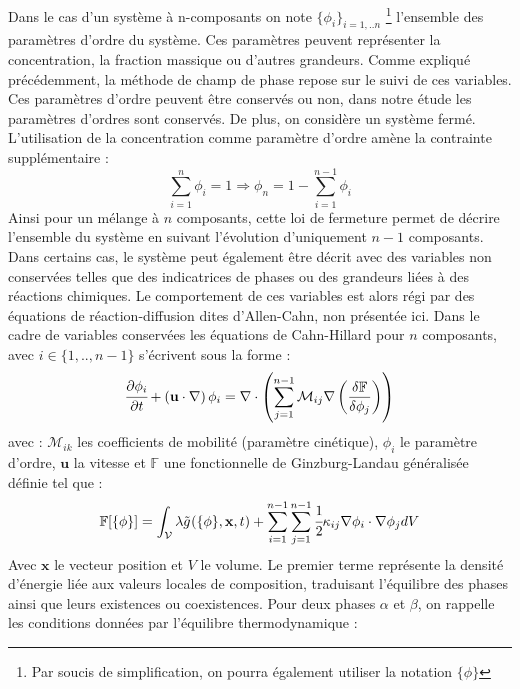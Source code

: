 Dans le cas d'un système à n-composants on note $\{\phi_i\}_{i=1,..n}$ \footnote{Par soucis de simplification, on pourra également utiliser la notation $\{\phi\}$} l'ensemble des paramètres d'ordre du système. Ces paramètres peuvent représenter la concentration, la fraction massique ou d'autres grandeurs.
Comme expliqué précédemment, la méthode de champ de phase repose sur le suivi de ces variables. Ces paramètres d'ordre peuvent être conservés ou non, dans notre étude les paramètres d'ordres sont conservés. De plus, on considère un système fermé. L'utilisation de la concentration comme paramètre d'ordre amène la contrainte supplémentaire :
\begin{equation}
\sum_{i=1}^n \phi_i =1 \Rightarrow \phi_n =1 - \sum_{i=1}^{n-1} \phi_i
\end{equation} 
Ainsi pour un mélange à $n$ composants, cette loi de fermeture permet de décrire l'ensemble du système en suivant l'évolution d'uniquement $n-1$ composants. Dans certains cas, le système peut également être décrit avec des variables non conservées telles que des indicatrices de phases ou des grandeurs liées à des réactions chimiques. Le comportement de ces variables est alors régi par des équations de réaction-diffusion dites d'Allen-Cahn, non présentée ici. Dans le cadre de variables conservées les équations de Cahn-Hillard pour $n$ composants, avec $i\in \{1,..,n-1 \}$ s'écrivent sous la forme :
\begin{equation}
	\cfrac{\partial \phi_i}{\partial t} + \left(\mathbf{u} \cdot \nabla\right) \phi_i =  \nabla \cdot \left(\sum_{j=1}^{n-1}{\mathcal{M}_{ij}} \nabla\left( \frac{\delta \mathbb{F}}{\delta \phi_j}\right) \right) 
\end{equation}
avec : $\mathcal{M}_{ik}$ les coefficients de mobilité (paramètre cinétique),  $\phi_i$ le paramètre d'ordre, $\mathbf{u}$ la vitesse et $\mathbb{F}$ une fonctionnelle de Ginzburg-Landau généralisée \cite{cardon_modelisation_2016} définie tel que : 
 \begin{equation}
\mathbb{F}[\{\phi\}] = \int_{\mathcal{V}}\lambda\tilde{g}^{}(\{\phi\},\mathbf{x},t)+ \sum_{i=1}^{n-1}\sum_{j=1}^{n-1}\cfrac{1}{2}\kappa_{ij}\nabla \phi_i \cdot \nabla \phi_j dV
\end{equation}
Avec $\mathbf{x}$ le vecteur position et $V$ le volume.
Le premier terme représente la densité d'énergie liée aux valeurs locales de composition, traduisant l'équilibre des phases ainsi que leurs existences ou coexistences. Pour deux phases $\alpha$ et $\beta$, on rappelle les conditions données par l'équilibre thermodynamique \cite{kim_phase-field_1999} :
